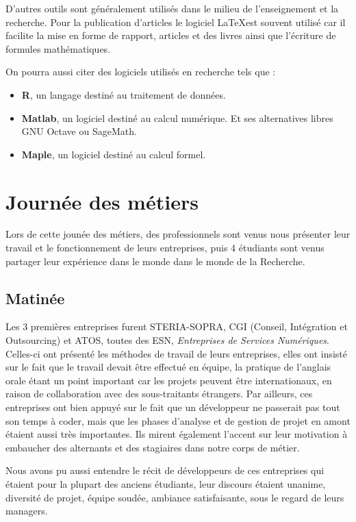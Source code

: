 \documentclass[14pt, a4paper]{report}
\begin{document}
  D'autres outils sont généralement utilisés dans le milieu de l'enseignement et la recherche. Pour la publication d'articles le logiciel \LaTeX est souvent utilisé car il facilite la mise en forme de rapport, articles et des livres ainsi que l'écriture de formules mathématiques.

  On pourra aussi citer des logiciels utilisés en recherche tels que :
  \begin{itemize}
  	\item \textbf{R}, un langage destiné au traitement de données.
  	\item \textbf{Matlab}, un logiciel destiné au calcul numérique. Et ses alternatives libres GNU Octave ou SageMath.
  	\item \textbf{Maple}, un logiciel destiné au calcul formel.
  \end{itemize}

\chapter{Journée des métiers}

Lors de cette jounée des métiers, des professionnels sont venus nous présenter leur travail et le fonctionnement de leurs entreprises, puis 4 étudiants sont venus partager leur expérience dans le monde dans le monde de la Recherche.

\section{Matinée}

Les 3 premières entreprises furent STERIA-SOPRA, CGI (Conseil, Intégration et Outsourcing) et ATOS, toutes des ESN, \emph{Entreprises de Services Numériques}. Celles-ci ont présenté les méthodes de travail de leurs entreprises, elles ont insisté sur le fait que le travail devait être effectué en équipe, la pratique de l'anglais orale étant un point important car les projets peuvent être internationaux, en raison de collaboration avec des sous-traitants étrangers. Par ailleurs, ces entreprises ont bien appuyé sur le fait que un développeur ne passerait pas tout son temps à coder, mais que les phases d'analyse et de gestion de projet en amont étaient aussi très importantes. Ils mirent également l'accent sur leur motivation à embaucher des alternants et des stagiaires dans notre corps de métier.

Nous avons pu aussi entendre le récit de développeurs de ces entreprises qui étaient pour la plupart des anciens étudiants, leur discours étaient unanime, diversité de projet, équipe soudée, ambiance satisfaisante, sous le regard de leurs managers.
\end{document}

